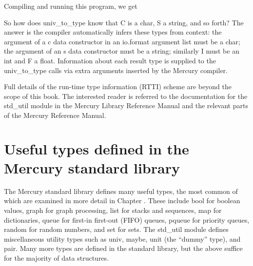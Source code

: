 \documentclass[a4paper,11pt,notitlepage,onecolumn]{book}
\begin{document}
Compiling and running this program, we get
\begin{small}

\begin{ptabular}
\nextline
{}
\nextline
{}
\nextline
{}
\nextline
{}
\nextline
{}
\nextline
{}
\nextline
{}
\nextline
{}
\nextline
{}
\nextline
\end{ptabular}

\end{small}
So how does \textsf{univ\_to\_type} know that \textsf{C} is a \textsf{char}, \textsf{S} a string, and so
forth?  The answer is the compiler automatically infers these types from
context: the argument of a \textsf{c} data constructor in an \textsf{io.format} argument
list must be a \textsf{char}; the argument of an \textsf{s} data constructor must be a
\textsf{string}; similarly \textsf{I} must be an \textsf{int} and \textsf{F} a \textsf{float}.  Information
about each result type is supplied to the \textsf{univ\_to\_type} calls via extra
arguments inserted by the Mercury compiler.

Full details of the run-time type information (RTTI) scheme are beyond the
scope of this book.  The interested reader is referred to the documentation
for the \textsf{std\_util} module in the Mercury Library Reference Manual and the
relevant parts of the Mercury Reference Manual.



\section{Useful types defined in the Mercury standard library}

The Mercury standard library defines many useful types, the most common of
which are examined in more detail in Chapter \XXX{}.  These include \textsf{bool}
for boolean values, \textsf{graph} for graph processing, \textsf{list} for stacks and
sequences, \textsf{map} for dictionaries, \textsf{queue} for first-in first-out (FIFO)
queues, \textsf{pqueue} for priority queues, \textsf{random} for random numbers, and \textsf{set}
for sets.  The \textsf{std\_util} module defines miscellaneous utility types such as
\textsf{univ}, \textsf{maybe}, \textsf{unit} (the ``dummy'' type), and \textsf{pair}.  Many more types
are defined in the standard library, but the above suffice for the majority
of data structures.
\end{document}
